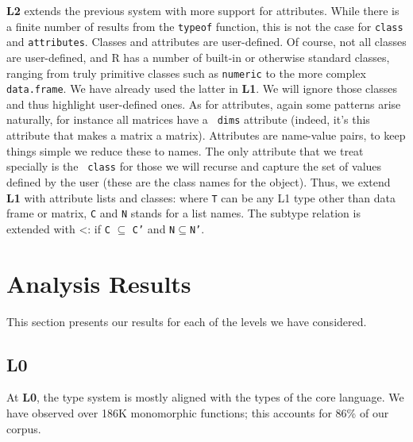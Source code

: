 \documentclass[acmsmall,10pt,review,anonymous]{acmart}\settopmatter{printfolios=true,printccs=false,printacmref=false}
\newcommand{\code}[1]{\lstinline|#1|\xspace}
\begin{document}
{\bf L2} extends the previous system with more support for attributes.
While there is a finite number of results from the {\tt typeof} function,
this is not the case for \code{class} and \code{attributes}.  Classes and
attributes are user-defined.  Of course, not all classes are user-defined,
and R has a number of built-in or otherwise standard classes, ranging from
truly primitive classes such as {\tt numeric} to the more complex {\tt
  data.frame}.  We have already used the latter in {\bf L1}. We will ignore
those classes and thus highlight user-defined ones.  As for attributes,
again some patterns arise naturally, for instance all matrices have a {\tt
  dims} attribute (indeed, it's this attribute that makes a matrix a
matrix).  Attributes are name-value pairs, to keep things simple we reduce
these to names. The only attribute that we treat specially is the {\tt
  class} for those we will recurse and capture the set of values defined by
the user (these are the class names for the object).  Thus, we extend {\bf
  L1} with attribute lists and classes:  where {\tt T}
can be any L1 type other than data frame or matrix, {\tt C} and {\tt N}
stands for a list names.  The subtype relation is extended with
<: if {\tt C} $\subseteq$ {\tt C'}
and {\tt N}$\subseteq${\tt N'}.

%
%
%
%
%
%
\section{Analysis Results}\label{sec:results}

This section presents our results for each of the levels we have considered.


\subsection{L0}

At {\bf L0}, the type system is mostly aligned with the types of the core language.  We
have observed over 186K monomorphic functions; this accounts for 86\% of our
corpus. 
\end{document}
